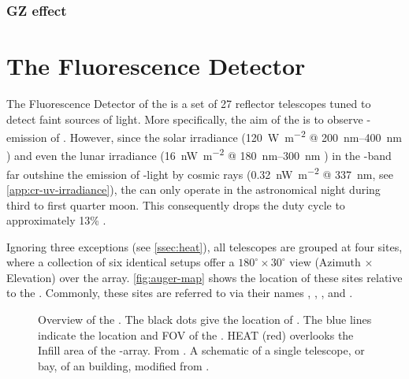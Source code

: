 \subsubsection{GZ effect}

\section{The Fluorescence Detector}
\label{sec:fd}

The Fluorescence Detector of the \PAO is a set of 27 reflector telescopes tuned
to detect faint sources of \UV light. More specifically, the aim of the \FD is
to observe \UV-emission of \EAS. However, since the solar irradiance 
(\SI{120}{\watt\per\meter\squared} @
\SIrange[range-phrase={--}]{200}{400}{\nano\meter} 
\cite{quemerais_absolute_2013}) and even the lunar irradiance 
(\SI{16}{\nano\watt\per\meter\squared} @
\SIrange[range-phrase={--}]{180}{300}{\nano\meter} 
\cite{lean_contribution_1989}) in the \UV-band far outshine the emission of 
\UV-light by cosmic rays (\SI{0.32}{\nano\watt\per\meter\squared} @ 
\SI{337}{\nano\meter}, see \cref{app:cr-uv-irradiance}), the \FD can only 
operate in the astronomical night during third to first quarter moon. This consequently drops the duty cycle 
to approximately 13\% \cite{abraham_fluorescence_2010}.

Ignoring three exceptions (see \autoref{ssec:heat}), all telescopes are grouped
at four \FD sites, where a collection of six identical setups offer a $180^\circ
\times30^\circ$ view (Azimuth $\times$ Elevation) over the \SD array. 
\autoref{fig:auger-map} shows the location of these sites relative to the \SD.
Commonly, these sites are referred to via their names \CO, \LA, \LM, and \LL.

\begin{figure}[t]
  \centering
  \hspace{0.2cm}
  \caption[]{ Overview of the \PAO. The black dots give the 
  location of \WCDs. The blue lines indicate the location and FOV of the \FD. 
  HEAT (red) overlooks the Infill area of the \SD-array. From 
  \cite{veberic_index_nodate}.  A schematic of a single
  telescope, or bay, of an \FD building, modified from 
\cite{abraham_fluorescence_2010}.}
  \label{fig:pao-images}
\end{figure}


